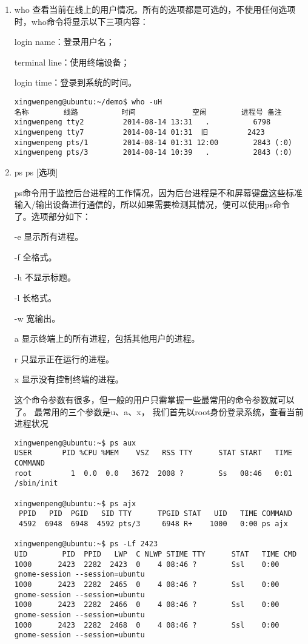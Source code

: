 \documentclass[11pt]{article}
\begin{document}
\begin{enumerate}
\item who
\label{sec-1-1-8-1}
查看当前在线上的用户情况。所有的选项都是可选的，不使用任何选项时，who命令将显示以下三项内容： 

login name：登录用户名； 

terminal line：使用终端设备； 

login time：登录到系统的时间。 

\begin{verbatim}
xingwenpeng@ubuntu:~/demo$ who -uH
名称        线路          时间             空闲        进程号 备注
xingwenpeng tty2         2014-08-14 13:31   .          6798
xingwenpeng tty7         2014-08-14 01:31  旧         2423
xingwenpeng pts/1        2014-08-14 01:31 12:00        2843 (:0)
xingwenpeng pts/3        2014-08-14 10:39   .          2843 (:0)
\end{verbatim}

\item ps
\label{sec-1-1-8-2}
ps [选项]

ps命令用于监控后台进程的工作情况，因为后台进程是不和屏幕键盘这些标准输入/输出设备进行通信的，所以如果需要检测其情况，便可以使用ps命令了。选项部分如下： 

-e 显示所有进程。 

-f 全格式。 

-h 不显示标题。 

-l 长格式。 

-w 宽输出。 

a 显示终端上的所有进程，包括其他用户的进程。 

r 只显示正在运行的进程。 

x 显示没有控制终端的进程。 

这个命令参数有很多，但一般的用户只需掌握一些最常用的命令参数就可以了。 最常用的三个参数是u、a、x， 我们首先以root身份登录系统，查看当前进程状况 

\begin{verbatim}
xingwenpeng@ubuntu:~$ ps aux
USER       PID %CPU %MEM    VSZ   RSS TTY      STAT START   TIME COMMAND
root         1  0.0  0.0   3672  2008 ?        Ss   08:46   0:01 /sbin/init

xingwenpeng@ubuntu:~$ ps ajx
 PPID   PID  PGID   SID TTY      TPGID STAT   UID   TIME COMMAND
 4592  6948  6948  4592 pts/3     6948 R+    1000   0:00 ps ajx

xingwenpeng@ubuntu:~$ ps -Lf 2423
UID        PID  PPID   LWP  C NLWP STIME TTY      STAT   TIME CMD
1000      2423  2282  2423  0    4 08:46 ?        Ssl    0:00 gnome-session --session=ubuntu
1000      2423  2282  2465  0    4 08:46 ?        Ssl    0:00 gnome-session --session=ubuntu
1000      2423  2282  2466  0    4 08:46 ?        Ssl    0:00 gnome-session --session=ubuntu
1000      2423  2282  2468  0    4 08:46 ?        Ssl    0:00 gnome-session --session=ubuntu


\end{verbatim}
\end{enumerate}
\end{document}
